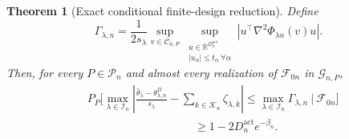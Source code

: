 \documentclass[11pt]{article}
\newtheorem{theorem}{Theorem}[section]
\theoremstyle{definition}
\newcommand{\1}{\mathbf 1}\newcommand{\op}{\operatorname}
\begin{document}
\begin{theorem}[Exact conditional finite-design reduction]
Define
\begin{equation}
\Gamma_{\lambda,n}
=
\frac{1}{2s_\lambda}
\sup_{v\in\mathcal C_{n,P}}
\sup_{\substack{
u\in\mathbb R^{D_n^{\mathrm{act}}}\\
|u_\alpha|\le t_\alpha\ \forall\alpha}}
\left|
u^\top\nabla^2\Phi_{\lambda n}(v)u
\right|.
\label{eq:curvature-envelope-final}
\end{equation}
Then, for every $P\in\mathcal P_n$ and almost every realization of
$\mathcal F_{0n}$ in $\mathcal G_{n,P}$,
\begin{equation}
\begin{split}
&P_P\Bigg[
\max_{\lambda\in\mathcal I_n}
\left|
\frac{\widehat\theta_\lambda-\theta_{\lambda,n}^D}{s_\lambda}
-
\sum_{k\in\mathcal K_n}\zeta_{\lambda,k}
\right|
\le
\max_{\lambda\in\mathcal I_n}\Gamma_{\lambda,n}
\ \Bigg|\ \mathcal F_{0n}
\Bigg]\\
&\hspace{4cm}
\ge
1-2D_n^{\mathrm{act}}e^{-\beta_n}.
\end{split}
\label{eq:exact-finite-sample-bound-final}
\end{equation}
\end{theorem}
\end{document}
